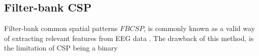 \subsection{Filter-bank CSP}
Filter-bank common spatial patterns \(FBCSP\), is commonly known as a valid way of extracting relevant features from EEG data . The drawback of this method, is the limitation of CSP being a binary  
